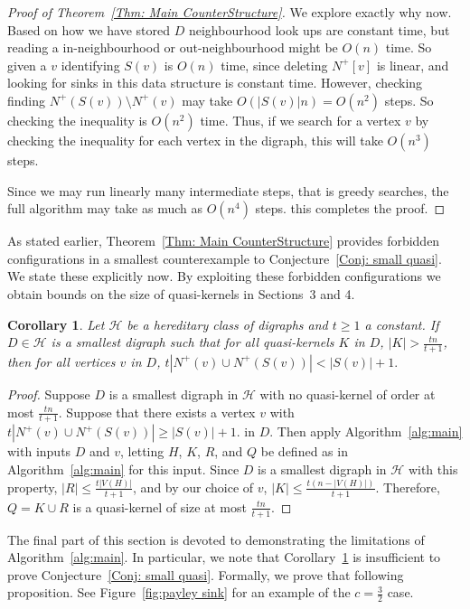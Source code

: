 \documentclass[12pt]{article}
\newtheorem{corollary}[theorem]{Corollary}
\theoremstyle{definition}
\begin{document}
\begin{proof}[Proof of Theorem~\ref{Thm: Main CounterStructure}]
    We explore exactly why now.
    Based on how we have stored $D$ neighbourhood look ups are constant time, but reading a in-neighbourhood or out-neighbourhood 
    might be $O(n)$ time.
    So given a $v$ identifying $S(v)$ is $O(n)$ time, since deleting $N^+[v]$ is linear, and looking for sinks in this data structure is constant time.
    However, checking finding $N^+(S(v))\setminus N^+(v)$ may take $O(|S(v)|n) = O(n^2)$ steps.
    So checking the inequality is $O(n^2)$ time.
    Thus, if we search for a vertex $v$ by checking the inequality for each vertex in the digraph, 
    this will take $O(n^3)$ steps.

    Since we may run linearly many intermediate steps, that is greedy searches,
    the full algorithm may take as much as $O(n^4)$ steps.
    this completes the proof.
\end{proof}

As stated earlier, Theorem~\ref{Thm: Main CounterStructure} provides forbidden configurations in a smallest counterexample to Conjecture~\ref{Conj: small quasi}. We state these explicitly now. By exploiting these forbidden configurations
we obtain bounds on the size of quasi-kernels in Sections~3 and 4.

\begin{corollary}\label{Coro: Smallest}
    Let $\mathcal{H}$ be a hereditary class of digraphs and $t\geq 1$ a constant.
    If $D \in \mathcal{H}$ is a smallest digraph such that for all quasi-kernels $K$ in $D$, $|K| > \frac{tn}{t+1}$,
    then for all vertices $v$ in $D$,
    $
    t|N^+(v) \cup N^+(S(v))| < |S(v)|+1.
    $
\end{corollary}

\begin{proof}
    Suppose $D$ is a smallest digraph in $\mathcal{H}$ with no 
    quasi-kernel of order at most $\frac{tn}{t+1}$.
    Suppose that there exists a vertex $v$ with 
    $
    t|N^+(v) \cup N^+(S(v))| \geq |S(v)|+1.
    $
    in $D$.
    Then apply Algorithm~\ref{alg:main} with inputs $D$ and $v$,
    letting $H$, $K$, $R$, and $Q$ be defined as in Algorithm~\ref{alg:main} for this input.
    Since $D$ is a smallest digraph in $\mathcal{H}$ with this property, 
    $|R|\leq \frac{t|V(H)|}{t+1}$, and by our choice of $v$, $|K|\leq \frac{t(n - |V(H)|)}{t+1}$.
    Therefore, $Q = K\cup R$ is a quasi-kernel of size at most $\frac{tn}{t+1}$.
\end{proof}



The final part of this section is devoted to demonstrating the limitations of Algorithm~\ref{alg:main}.
In particular, we note that Corollary~\ref{Coro: Smallest} is insufficient to prove Conjecture~\ref{Conj: small quasi}.
Formally, we prove that following proposition.
See Figure~\ref{fig:payley sink} for an example of the $c = \frac{3}{2}$ case.
\end{document}
